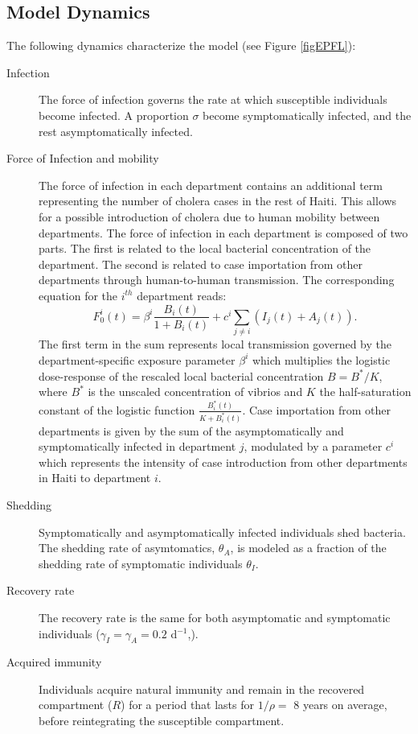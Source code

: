 \subsection{Model Dynamics} 
The following dynamics characterize the model (see Figure \ref{figEPFL}):
\begin{description}
    \item[Infection] The force of infection governs the rate at which susceptible individuals become infected. A proportion $\sigma$ become symptomatically infected, and the rest asymptomatically infected. 
    \item[Force of Infection and mobility] The force of infection in each department contains an additional term representing the number of cholera cases in the rest of Haiti. This allows for a possible introduction of cholera due to  human mobility between departments. The force of infection in each department is composed of two parts. The first is related to the local bacterial concentration of the department. The second is related to case importation from other departments through human-to-human transmission. The corresponding equation for the $i^{th}$ department reads:
    \begin{equation*}
    F^i_0(t)=\beta^i\frac{B_i(t)}{1+B_i(t)}+c^i \sum_{j\ne i} (I_j(t)+A_j(t)).
    \end{equation*}
    The first term in the sum represents local transmission governed by the department-specific exposure parameter $\beta^i$ which multiplies the logistic dose-response of the rescaled local bacterial concentration $B = B^*/K$, where $B^*$ is the unscaled concentration of vibrios and $K$ the half-saturation constant of the logistic function $\frac{B^*_i(t)}{K+B^*_i(t)}$.
    Case importation from other departments is given by the sum of the asymptomatically and symptomatically infected in department $j$, modulated by a parameter $c^i$ which represents the intensity of case introduction from other departments in Haiti  to department $i$.
    \item[Shedding] Symptomatically and asymptomatically infected individuals shed bacteria. The shedding rate of asymtomatics, $\theta_A$, is modeled as a fraction of the shedding rate of symptomatic individuals  $\theta_I$\cite{Kuhn:GlucoseNotRiceBased:2014}.
    \item[Recovery rate] The recovery rate is the same for both asymptomatic and symptomatic individuals ($\gamma_I=\gamma_A=0.2$ d$^{-1}$,\cite{Kaper:Cholera:1995, Codeco:EndemicEpidemicDynamics:2001}).
    \item[Acquired immunity] Individuals acquire natural immunity and remain in the recovered compartment ($R$) for a period that lasts for $1/\rho=$ 8 years on average, before reintegrating the susceptible compartment.

\end{description}
